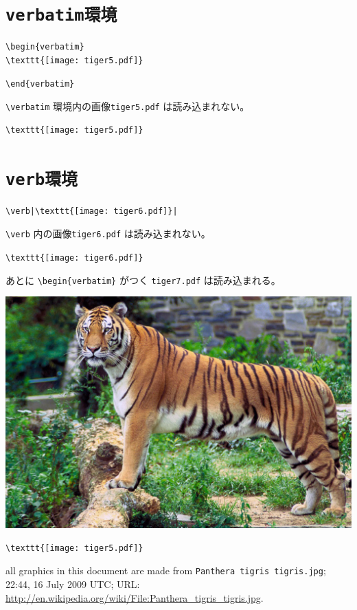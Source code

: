 \documentclass{jsarticle}
\begin{document}
\section{\tt{verbatim}環境}

\begin{verbatim}
\begin{verbatim}
\texttt{[image: tiger5.pdf]}
\end{verbatim}
\verb|\end{verbatim}|

\verb|\verbatim| 環境内の画像\texttt{tiger5.pdf} は読み込まれない。

\begin{verbatim}
\texttt{[image: tiger5.pdf]}
\end{verbatim}

\section{\tt{verb}環境}
\begin{verbatim}
\verb|\texttt{[image: tiger6.pdf]}|
\end{verbatim}

\verb|\verb| 内の画像\texttt{tiger6.pdf} は読み込まれない。

\verb|\texttt{[image: tiger6.pdf]}|

\vspace{4zw}

あとに \verb|\begin{verbatim}| がつく \texttt{tiger7.pdf} は読み込まれる。

\includegraphics[width=15cm]{tiger7.pdf} \begin{verbatim}
\texttt{[image: tiger5.pdf]}
\end{verbatim}

all graphics in this document are made from \verb|Panthera tigris tigris.jpg|; 22:44, 16 July 2009 UTC; URL: \url{http://en.wikipedia.org/wiki/File:Panthera_tigris_tigris.jpg}.
\end{document}
